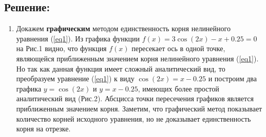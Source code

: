 \hypertarget{ux440ux435ux448ux435ux43dux438ux435}{%
\subsection{Решение:}\label{ux440ux435ux448ux435ux43dux438ux435}}

\begin{enumerate}
\def\labelenumi{\arabic{enumi}.}
\item
  Докажем \textbf{графическим} методом единственность корня нелинейного
  уравнения (\ref{eq1}). Из графика функции
  \(f(x) = 3 \cos(2x) - x + 0.25 = 0\) на Рис.1 видно, что функция
  \(f(x)\) пересекает ось в одной точке, являющейся приближенным
  значением корня нелинейного уравнения (\ref{eq1}). Но так как данная
  функция имеет сложный аналитический вид, то преобразуем уравнение
  (\ref{eq1}) к виду \(\cos(2x) = x - 0.25\) и построим два графика
  \(y = \cos(2x)\) и \(y = x - 0.25\), имеющих более простой
  аналитический вид (Рис.2). Абсцисса точки пересечения графиков
  является приближенным значением корня. Заметим, что графический метод
  показывает количество корней исходного уравнения, но не доказывает
  единственность корня на отрезке.

  \vspace{1em}



\end{enumerate}
